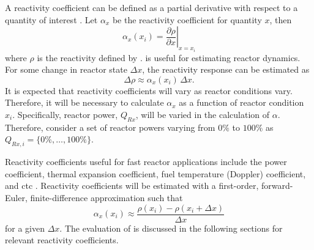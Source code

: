   A reactivity coefficient can be defined as a partial derivative with respect
  to a quantity of interest \cite{textbookknief}. Let $\alpha_x$ be the 
  reactivity coefficient for quantity $x$, then
  \begin{equation}
    \label{eq:reactivity_coefficient}
    \alpha_x(x_i) = \left. \frac{\partial \rho}{\partial x} \right|_{x=x_i}
  \end{equation}
  where $\rho$ is the reactivity defined by .
   is useful for estimating reactor dynamics.
  For some change in reactor state $\Delta x$, the reactivity response can be
  estimated as 
  \begin{equation}
    \label{eq:reactivity_estimate}
    \Delta \rho \approx \alpha_x(x_i) \, \Delta x.
  \end{equation}
  It is expected that reactivity coefficients will vary as reactor conditions
  vary. Therefore, it will be necessary to calculate $\alpha_x$ as a function of
  reactor condition $x_i$. Specifically, reactor power, $Q_{Rx}$, will be varied 
  in the calculation of $\alpha$. Therefore, consider a set of reactor powers
  varying from $0\%$ to $100\%$ as $Q_{Rx,i} = \{0\%,\ldots,100\%\}$.

  Reactivity coefficients useful for fast reactor applications include the power 
  coefficient, thermal expansion coefficient, fuel temperature (Doppler)
  coefficient, and \gls{ctc} \cite{textbookknief}.
  Reactivity coefficients will be estimated with a first-order, forward-Euler,
  finite-difference approximation such that
  \begin{equation}
    \label{eq:reactivity_coefficient_finite_difference}
    \alpha_x(x_i) \approx \frac{\rho(x_i) - \rho(x_i + \Delta x)}{\Delta x}
  \end{equation}
  for a given $\Delta x$. The evaluation of
   is discussed in the
  following sections for relevant reactivity coefficients.

